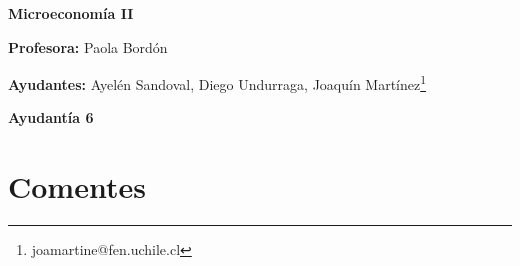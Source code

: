 \documentclass{exam}
\renewcommand{\thefootnote}{\fnsymbol{footnote}}
\begin{document}
\begin{center}

\LARGE{\textbf{Microeconomía II}}

\medskip
\normalsize \textbf{Profesora:} Paola Bordón

\normalsize \textbf{Ayudantes:} Ayelén Sandoval, Diego Undurraga, Joaquín Martínez\footnote[2]{joamartine@fen.uchile.cl}


\medskip
\large{\textbf{Ayudantía 6}}

\end{center}

\tableofcontents

\renewcommand{\thefootnote}{\Roman{footnote}}

\section{Comentes}
\end{document}
